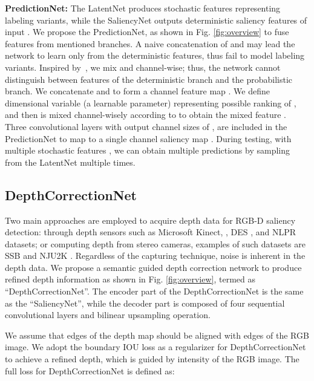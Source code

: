 \documentclass[10pt,twocolumn,letterpaper]{article}
\begin{document}
\noindent\textbf{PredictionNet:}
The LatentNet produces stochastic features  representing labeling variants, while the SaliencyNet outputs deterministic saliency features  of input . We propose the PredictionNet, as shown in Fig. \ref{fig:overview} to fuse features from mentioned branches.
A naive concatenation of  and  may lead the network to learn only from the deterministic features,
thus fail to model labeling variants. Inspired by~\cite{aliakbarian2019learning}, 
we mix  and  channel-wise; thus, the network cannot distinguish between features of the deterministic branch and the probabilistic branch.
We concatenate  and  to form a  channel feature map . We define  dimensional variable  (a learnable parameter) representing possible ranking of , and then  is mixed channel-wisely according to  
to obtain the mixed feature .
Three  convolutional layers with output channel sizes of , are included in the PredictionNet to map  to a single channel saliency map . 
During testing, with multiple stochastic features , we can obtain multiple predictions by sampling  from the LatentNet  multiple times.











\subsection{DepthCorrectionNet}
Two main approaches are employed to acquire depth data for RGB-D saliency detection: through depth sensors such as Microsoft Kinect, \eg, DES \cite{cheng2014depth}, and NLPR \cite{peng2014rgbd} datasets; or computing depth from stereo cameras, examples of such datasets are SSB \cite{niu2012leveraging} and NJU2K \cite{NJU2000}. Regardless of the capturing technique, noise is inherent in the depth data. 
We propose a semantic guided depth correction network to produce refined depth information 
as shown in Fig. \ref{fig:overview}, termed as \enquote{DepthCorrectionNet}. The encoder part of the DepthCorrectionNet is the same as the \enquote{SaliencyNet}, while the decoder part is composed of four sequential convolutional layers and bilinear upsampling operation.




We assume that edges of the depth map should be aligned with edges of the RGB image. We adopt the boundary IOU loss \cite{Luo2017CVPR} as a regularizer for DepthCorrectionNet to achieve a refined depth, which is guided by intensity of the RGB image. The full loss for DepthCorrectionNet is defined as:
\end{document}
